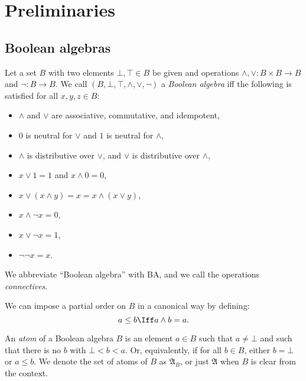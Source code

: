 
\section{Preliminaries}
\label{sect-prelim}

\subsection{Boolean algebras}

\begin{definition}
Let a set $B$ with two elements $\bot, \top \in B$ be given and operations ${\land}, {\lor} : B \times B \rightarrow B$ and ${\neg} : B \rightarrow B$. We call $(B,\bot,\top,\land,\lor,\neg)$ a \emph{Boolean algebra} iff  the following is satisfied for all $x, y, z \in B$:
\begin{itemize}
	\item ${\land}$ and $\lor$ are associative, commutative, and idempotent,
	\item $0$ is neutral for $\lor$ and $1$ is neutral for $\land$,
	\item $\land$ is distributive over $\lor$, and $\lor$ is distributive over $\land$,
	\item $x \lor 1 = 1$ and $x \land 0 = 0$,
	\item $x \lor (x \land y) = x = x \land (x \lor y)$,
	\item $x \land \neg x = 0$,
	\item $x \lor \neg x = 1$,
	\item $\neg \neg x = x$.
\end{itemize}
We abbreviate ``Boolean algebra'' with BA, and we call the operations \emph{connectives}. 
\end{definition}

We can impose a partial order on $B$ in a canonical way by defining:
\begin{equation*}
a \le b \Iff a \land b = a.
\end{equation*}

\begin{definition}[Atom]
An \emph{atom} of a Boolean algebra $B$ is an element $a\in B$ such that $a \ne \bot$ and such that there is no $b$ with $\bot < b < a$. Or, equivalently, if for all $b\in B$, either $b=\bot$ or $a \le b$. We denote the set of atoms of $B$ as $\mathfrak{A}_B$, or just $\mathfrak{A}$ when $B$ is clear from the context.
\end{definition}

